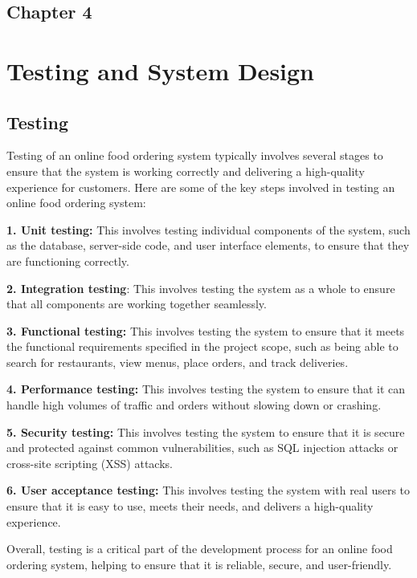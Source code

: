 \begin{center}
    \section*{\fontsize{20}{20}\selectfont Chapter 4}
\end{center}
\vspace{10mm}

\section{Testing and System Design}
\vspace{3mm}
\large{\subsection{Testing}{Testing of an online food ordering system typically involves several stages to ensure that the system is working correctly and delivering a high-quality experience for customers. Here are some of the key steps involved in testing an online food ordering system:

\textbf{1. Unit testing:} This involves testing individual components of the system, such as the database, server-side code, and user interface elements, to ensure that they are functioning correctly.

\textbf{2. Integration testing}: This involves testing the system as a whole to ensure that all components are working together seamlessly.

\textbf{3. Functional testing:} This involves testing the system to ensure that it meets the functional requirements specified in the project scope, such as being able to search for restaurants, view menus, place orders, and track deliveries.

\textbf{4. Performance testing:} This involves testing the system to ensure that it can handle high volumes of traffic and orders without slowing down or crashing.

\textbf{5. Security testing:} This involves testing the system to ensure that it is secure and protected against common vulnerabilities, such as SQL injection attacks or cross-site scripting (XSS) attacks.

\textbf{6. User acceptance testing:} This involves testing the system with real users to ensure that it is easy to use, meets their needs, and delivers a high-quality experience.

Overall, testing is a critical part of the development process for an online food ordering system, helping to ensure that it is reliable, secure, and user-friendly.}}


